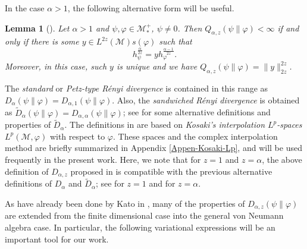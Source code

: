 \documentclass[12pt]{article}
\newtheorem{lemma}[theorem]{Lemma}
\theoremstyle{definition}
\theoremstyle{remark}
\numberwithin{equation}{section}
\def\Me{\mathcal M}
\begin{document}
\medskip
In the case $\alpha>1$, the following alternative form will be useful.

\begin{lemma}[\mbox{\cite[Lemma 7]{kato2023onrenyi}}]\label{lemma:renyi_2z}
Let $\alpha>1$ and $\psi,\varphi\in \Me_*^+$, $\psi\ne0$. Then $Q_{\alpha,z}(\psi\|\varphi)<\infty$
if and only if there is some $y\in L^{2z}(\Me)s(\varphi)$ such that 
\[
h_\psi^{\frac{\alpha}{2z}}=yh_\varphi^{\frac{\alpha-1}{2z}}.
\]
Moreover, in this case, such $y$ is unique and we have
$Q_{\alpha,z}(\psi\|\varphi)=\|y\|_{2z}^{2z}$. 
\end{lemma}

The \emph{standard} or \emph{Petz-type R\'enyi divergence}
\cite{petz1985quasi,hiai2018quantum,hiai2021quantum} is contained in this range as
$D_\alpha(\psi\|\varphi)=D_{\alpha,1}(\psi\|\varphi)$. Also, the \emph{sandwiched R\'enyi divergence} is
obtained as $\tilde D_\alpha(\psi\|\varphi)=D_{\alpha,\alpha}(\psi\|\varphi)$; see
\cite{berta2018renyi,hiai2021quantum,jencova2018renyi, jencova2021renyi} for some
alternative definitions and properties of $\tilde D_\alpha$. The definitions in
\cite{jencova2018renyi,jencova2021renyi} are based on \emph{Kosaki's interpolation $L^p$-spaces}
$L^p(\Me,\varphi)$ \cite{kosaki1984applications} with respect to $\varphi$. These spaces and the
complex interpolation method are briefly summarized in Appendix \ref{Appen-Kosaki-Lp}, and will be used
frequently in the present work. {\color{blue}Here, we note that for $z=1$ and $z=\alpha$, the above
definition of $D_{\alpha,z}$ proposed in \cite{kato2023aremark, kato2023onrenyi} is compatible with the
previous alternative definitions of $D_\alpha$ and $\tilde D_\alpha$; see \cite[Theorem 3.6]{hiai2021quantum}
for $z=1$ and \cite[Lemma 9]{kato2023aremark} for $z=\alpha$.}


As have already been done by Kato in \cite{kato2023onrenyi}, many of the properties of
$D_{\alpha,z}(\psi\|\varphi)$ are extended from the finite dimensional case into the general von Neumann
algebra case. In particular, the following variational expressions will be an important tool for our work.
\end{document}
